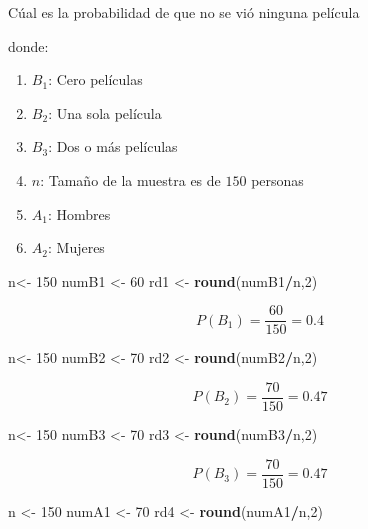 \documentclass[
]{book}
\newenvironment{Shaded}{\begin{snugshade}}{\end{snugshade}}
\newcommand{\DecValTok}[1]{\textcolor[rgb]{0.00,0.00,0.81}{#1}}
\newcommand{\KeywordTok}[1]{\textcolor[rgb]{0.13,0.29,0.53}{\textbf{#1}}}
\newcommand{\NormalTok}[1]{#1}
\newcommand{\OperatorTok}[1]{\textcolor[rgb]{0.81,0.36,0.00}{\textbf{#1}}}
\newcommand{\StringTok}[1]{\textcolor[rgb]{0.31,0.60,0.02}{#1}}
\theoremstyle{definition}
\theoremstyle{definition}
\theoremstyle{definition}
\theoremstyle{definition}
\theoremstyle{remark}
\begin{document}
Cúal es la probabilidad de que no se vió ninguna película

donde:

\begin{enumerate}
\def\labelenumi{\arabic{enumi})}
\item
  \(B_1\): Cero películas
\item
  \(B_2\): Una sola película
\item
  \(B_3\): Dos o más películas
\item
  \(n\): Tamaño de la muestra es de \(150\) personas
\item
  \(A_1\): Hombres
\item
  \(A_2\): Mujeres
\end{enumerate}

\begin{Shaded}
\begin{Highlighting}[]
\NormalTok{n<-}\StringTok{ }\DecValTok{150}
\NormalTok{numB1 <-}\StringTok{ }\DecValTok{60}
\NormalTok{rd1 <-}\StringTok{ }\KeywordTok{round}\NormalTok{(numB1}\OperatorTok{/}\NormalTok{n,}\DecValTok{2}\NormalTok{)}
\end{Highlighting}
\end{Shaded}

\[P(B_1)=\dfrac{60}{150}=0.4\]

\begin{Shaded}
\begin{Highlighting}[]
\NormalTok{n<-}\StringTok{ }\DecValTok{150}
\NormalTok{numB2 <-}\StringTok{ }\DecValTok{70}
\NormalTok{rd2 <-}\StringTok{ }\KeywordTok{round}\NormalTok{(numB2}\OperatorTok{/}\NormalTok{n,}\DecValTok{2}\NormalTok{)}
\end{Highlighting}
\end{Shaded}

\[P(B_2)=\dfrac{70}{150}=0.47\]

\begin{Shaded}
\begin{Highlighting}[]
\NormalTok{n<-}\StringTok{ }\DecValTok{150}
\NormalTok{numB3 <-}\StringTok{ }\DecValTok{70}
\NormalTok{rd3 <-}\StringTok{ }\KeywordTok{round}\NormalTok{(numB3}\OperatorTok{/}\NormalTok{n,}\DecValTok{2}\NormalTok{)}
\end{Highlighting}
\end{Shaded}

\[P(B_3)=\dfrac{70}{150}=0.47\]

\begin{Shaded}
\begin{Highlighting}[]
\NormalTok{n <-}\StringTok{ }\DecValTok{150}
\NormalTok{numA1 <-}\StringTok{ }\DecValTok{70}
\NormalTok{rd4 <-}\StringTok{ }\KeywordTok{round}\NormalTok{(numA1}\OperatorTok{/}\NormalTok{n,}\DecValTok{2}\NormalTok{)}
\end{Highlighting}
\end{Shaded}
\end{document}
